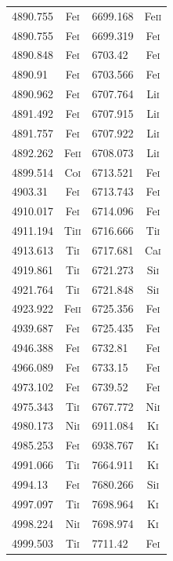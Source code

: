 \begin{longtable}[c]{|l|c|l|c|}
4890.755 & Fe\textsc{i} & 6699.168 & Fe\textsc{ii}\\ 
4890.755 & Fe\textsc{i} & 6699.319 & Fe\textsc{i}\\  
4890.848 & Fe\textsc{i} & 6703.42 & Fe\textsc{i}\\   
4890.91 & Fe\textsc{i} & 6703.566 & Fe\textsc{i}\\   
4890.962 & Fe\textsc{i} & 6707.764 & Li\textsc{i}\\  
4891.492 & Fe\textsc{i} & 6707.915 & Li\textsc{i}\\  
4891.757 & Fe\textsc{i} & 6707.922 & Li\textsc{i}\\  
4892.262 & Fe\textsc{ii} & 6708.073 & Li\textsc{i}\\ 
4899.514 & Co\textsc{i} & 6713.521 & Fe\textsc{i}\\  
4903.31 & Fe\textsc{i} & 6713.743 & Fe\textsc{i}\\   
4910.017 & Fe\textsc{i} & 6714.096 & Fe\textsc{i}\\  
4911.194 & Ti\textsc{ii} & 6716.666 & Ti\textsc{i}\\ 
4913.613 & Ti\textsc{i} & 6717.681 & Ca\textsc{i}\\  
4919.861 & Ti\textsc{i} & 6721.273 & Si\textsc{i}\\  
4921.764 & Ti\textsc{i} & 6721.848 & Si\textsc{i}\\  
4923.922 & Fe\textsc{ii} & 6725.356 & Fe\textsc{i}\\ 
4939.687 & Fe\textsc{i} & 6725.435 & Fe\textsc{i}\\  
4946.388 & Fe\textsc{i} & 6732.81 & Fe\textsc{i}\\   
4966.089 & Fe\textsc{i} & 6733.15 & Fe\textsc{i}\\   
4973.102 & Fe\textsc{i} & 6739.52 & Fe\textsc{i}\\   
4975.343 & Ti\textsc{i} & 6767.772 & Ni\textsc{i}\\  
4980.173 & Ni\textsc{i} & 6911.084 & K\textsc{i}\\   
4985.253 & Fe\textsc{i} & 6938.767 & K\textsc{i}\\   
4991.066 & Ti\textsc{i} & 7664.911 & K\textsc{i}\\   
4994.13 & Fe\textsc{i} & 7680.266 & Si\textsc{i}\\   
4997.097 & Ti\textsc{i} & 7698.964 & K\textsc{i}\\   
4998.224 & Ni\textsc{i} & 7698.974 & K\textsc{i}\\   
4999.503 & Ti\textsc{i} & 7711.42 & Fe\textsc{i}\\   

\end{longtable}
